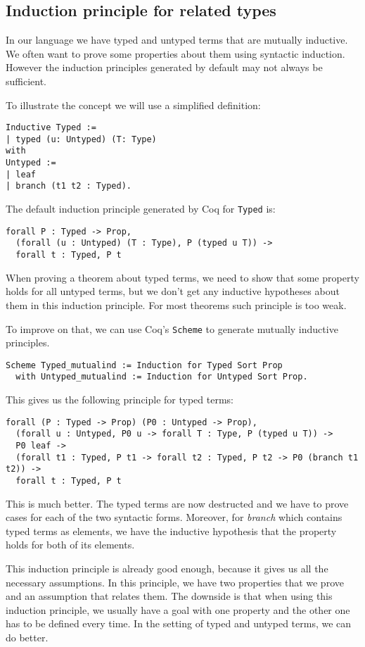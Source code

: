 \documentclass[runningheads]{article}
\begin{document}
\subsection{Induction principle for related types}
In our language we have typed and untyped terms that are mutually inductive. We often want to prove some properties about them using syntactic induction. However the induction principles generated by default may not always be sufficient.

To illustrate the concept we will use a simplified definition:
\begin{lstlisting}
Inductive Typed :=
| typed (u: Untyped) (T: Type)
with
Untyped :=
| leaf
| branch (t1 t2 : Typed).
\end{lstlisting}

The default induction principle generated by Coq for \texttt{Typed} is:
\begin{lstlisting}
forall P : Typed -> Prop,
  (forall (u : Untyped) (T : Type), P (typed u T)) -> 
  forall t : Typed, P t
\end{lstlisting}

When proving a theorem about typed terms, we need to show that some property holds for all untyped terms, but we don't get any inductive hypotheses about them in this induction principle. For most theorems such principle is too weak.

To improve on that, we can use Coq's \texttt{Scheme} to generate mutually inductive principles.

\begin{lstlisting}
Scheme Typed_mutualind := Induction for Typed Sort Prop
  with Untyped_mutualind := Induction for Untyped Sort Prop.
\end{lstlisting}

This gives us the following principle for typed terms:
\begin{lstlisting}
forall (P : Typed -> Prop) (P0 : Untyped -> Prop),
  (forall u : Untyped, P0 u -> forall T : Type, P (typed u T)) ->
  P0 leaf ->
  (forall t1 : Typed, P t1 -> forall t2 : Typed, P t2 -> P0 (branch t1 t2)) ->
  forall t : Typed, P t
\end{lstlisting}

This is much better. The typed terms are now destructed and we have to prove cases for each of the two syntactic forms. Moreover, for \textit{branch} which contains typed terms as elements, we have the inductive hypothesis that the property holds for both of its elements.

This induction principle is already good enough, because it gives us all the necessary assumptions. In this principle, we have two properties that we prove and an assumption that relates them. The downside is that when using this induction principle, we usually have a goal with one property and the other one has to be defined every time. In the setting of typed and untyped terms, we can do better.
\end{document}
